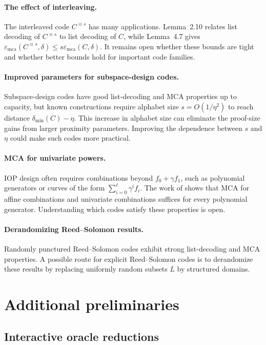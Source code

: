 \documentclass[11pt]{article}
\theoremstyle{plain}
\theoremstyle{definition}
\newcommand{\epsmca}{\varepsilon_{\mathrm{mca}}}
\newcommand{\distmin}{\delta_{\min}}
\begin{document}
\paragraph{The effect of interleaving.}
The interleaved code $C^{\equiv s}$ has many applications. Lemma~2.10 relates list decoding of $C^{\equiv s}$ to list decoding of $C$, while Lemma~4.7 gives $\epsmca(C^{\equiv s},\delta)\le s\epsmca(C,\delta)$. It remains open whether these bounds are tight and whether better bounds hold for important code families.

\paragraph{Improved parameters for subspace-design codes.}
Subspace-design codes have good list-decoding and MCA properties up to capacity, but known constructions require alphabet size $s=O(1/\eta^2)$ to reach distance $\distmin(C)-\eta$. This increase in alphabet size can eliminate the proof-size gains from larger proximity parameters. Improving the dependence between $s$ and $\eta$ could make such codes more practical.

\paragraph{MCA for univariate powers.}
IOP design often requires combinations beyond $f_0+\gamma f_1$, such as polynomial generators or curves of the form $\sum_{i=0}^\ell \gamma^i f_i$. The work of \cite{BCGM25} shows that MCA for affine combinations and univariate combinations suffices for every polynomial generator. Understanding which codes satisfy these properties is open.

\paragraph{Derandomizing Reed--Solomon results.}
Randomly punctured Reed--Solomon codes exhibit strong list-decoding and MCA properties. A possible route for explicit Reed--Solomon codes is to derandomize these results by replacing uniformly random subsets $L$ by structured domains.

\appendix

\section{Additional preliminaries}

\subsection{Interactive oracle reductions}
\end{document}
